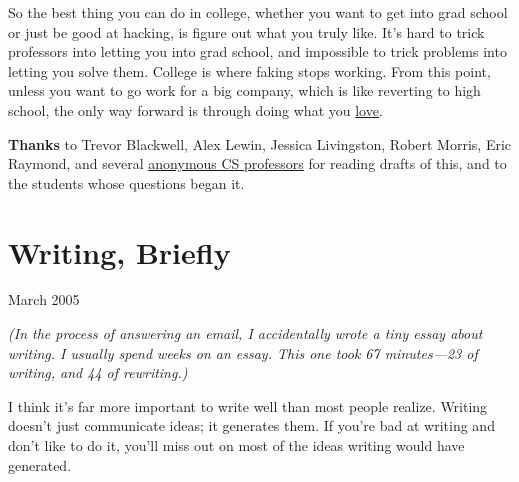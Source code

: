 \documentclass[12pt]{book}
\begin{document}
So the best thing you can do in college, whether you want to get into
grad school or just be good at hacking, is figure out what you truly
like. It's hard to trick professors into letting you into grad school,
and impossible to trick problems into letting you solve them. College is
where faking stops working. From this point, unless you want to go work
for a big company, which is like reverting to high school, the only way
forward is through doing what you \href{love.html}{love}.


\textbf{Thanks} to Trevor Blackwell, Alex Lewin, Jessica Livingston,
Robert Morris, Eric Raymond, and several
\href{undergrad2.html}{anonymous CS professors} for reading drafts of
this, and to the students whose questions began it.
\chapter{Writing,  Briefly}

March 2005

\emph{(In the process of answering an email, I accidentally wrote a tiny
essay about writing. I usually spend weeks on an essay. This one took 67
minutes---23 of writing, and 44 of rewriting.)}

I think it's far more important to write well than most people realize.
Writing doesn't just communicate ideas; it generates them. If you're bad
at writing and don't like to do it, you'll miss out on most of the ideas
writing would have generated.
\end{document}
